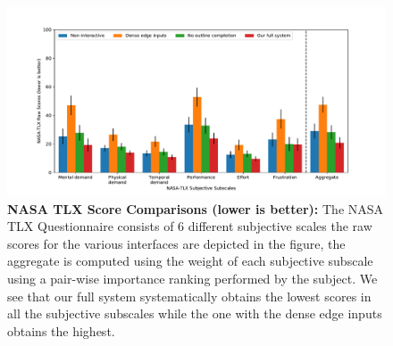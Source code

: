 \documentclass[10pt,twocolumn,letterpaper]{article}
\begin{document}
\begin{figure}[t]
    \centering
    \includegraphics[width=\linewidth]{user_study/barplots.pdf}
    \caption{{\bf NASA TLX Score Comparisons (lower is better): }
    The NASA TLX Questionnaire consists of 6 different subjective scales the raw scores for the various interfaces are depicted in the figure, the aggregate is computed using the weight of each subjective subscale using a pair-wise importance ranking performed by the subject. We see that our full system systematically obtains the lowest scores in all the subjective subscales while the one with the dense edge inputs obtains the highest.\label{fig:nasa-tlx}
    \vspace{-2mm}
    }
    \vspace{-2mm}
\end{figure}

\begin{table}[h]
\end{table}
\end{document}
